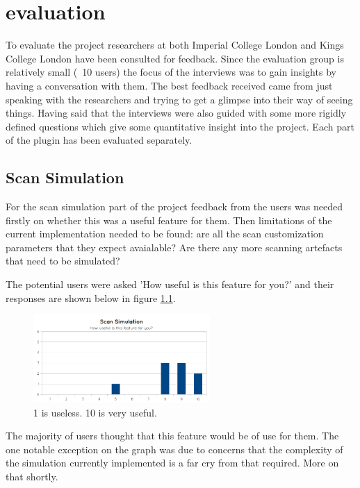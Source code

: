 \chapter{evaluation}\label{chapter:evaluation}

To evaluate the project researchers at both Imperial College London and Kings College London have been consulted for feedback. Since the evaluation group is relatively small (~10 users) the focus of the interviews was to gain insights by having a conversation with them. The best feedback received came from just speaking with the researchers and trying to get a glimpse into their way of seeing things. Having said that the interviews were also guided with some more rigidly defined questions which give some quantitative insight into the project. Each part of the plugin has been evaluated separately.

\section{Scan Simulation}
For the scan simulation part of the project feedback from the users was needed firstly on whether this was a useful feature for them. Then limitations of the current implementation needed to be found: are all the scan customization parameters that they expect avaialable? Are there any more scanning artefacts that need to be simulated?

The potential users were asked 'How useful is this feature for you?' and their responses are shown below in figure \ref{fig:graph_scansimulation_1}.

\begin{figure}[h]
    \centering
	\includegraphics[width=0.6\textwidth]{images/evaluation/graph_scan_simulation_1.png}
    \caption{1 is useless. 10 is very useful.}\label{fig:graph_scansimulation_1}
\end{figure}

The majority of users thought that this feature would be of use for them. The one notable exception on the graph was due to concerns that the complexity of the simulation currently implemented is a far cry from that required. More on that shortly.

